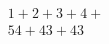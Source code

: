 \documentclass{article}
\begin{document}
\vspace*{\fill} \vspace*{-5ex}
\begin{multline}
1 + 2 + 3 + 4 + \\ 
54 + 43 + 43
\end{multline}
\vspace*{\fill}
\end{document}
